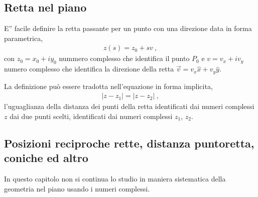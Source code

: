\documentclass[letterpaper,10pt,italian]{jupyterBook}
\begin{document}
\subsection{Retta nel piano}
\label{\detokenize{ch/algebra/complex-algebra:retta-nel-piano}}
\sphinxAtStartPar
{} E” facile definire la retta passante per un punto con una direzione data in forma parametrica,
\begin{equation*}
\begin{split}z(s) = z_0 + s v \ ,\end{split}
\end{equation*}
\sphinxAtStartPar
con \(z_0 = x_0 + i y_0\) nummero complesso che identifica il punto \(P_0\) e \(v = v_x + i v_y\) numero complesso che identifica la direzione della retta \(\vec{v} = v_x \hat{x} + v_y \hat{y}\).

\sphinxAtStartPar
{} La definizione può essere tradotta nell’equazione in forma implicita,
\begin{equation*}
\begin{split}|z - z_1| = |z - z_2| \ ,\end{split}
\end{equation*}
\sphinxAtStartPar
l’uguaglianza della distanza dei punti della retta identificati dai numeri complessi \(z\) dai due punti scelti, identificati dai numeri complessi \(z_1\), \(z_2\).


\subsection{Posizioni reciproche rette, distanza punto\sphinxhyphen{}retta, coniche ed altro}
\label{\detokenize{ch/algebra/complex-algebra:posizioni-reciproche-rette-distanza-punto-retta-coniche-ed-altro}}
\sphinxAtStartPar
In questo capitolo non si continua lo studio in maniera sistematica della geometria nel piano usando i numeri complessi.
\end{document}
